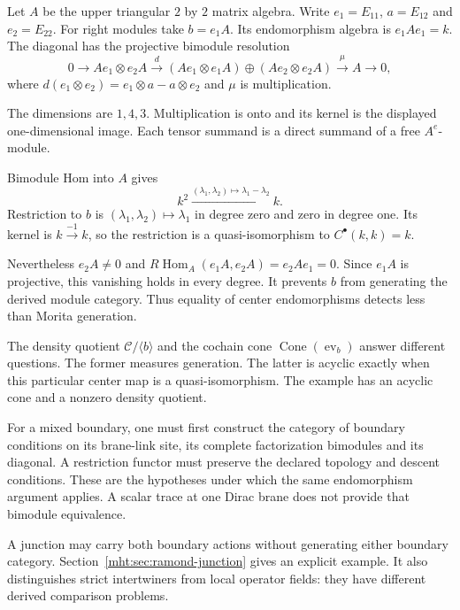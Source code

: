 \begin{example}\label{mht:ex:centre-without-density}
Let $A$ be the upper triangular $2$ by $2$ matrix algebra. Write
$e_1=E_{11}$, $a=E_{12}$ and $e_2=E_{22}$. For right modules take
$b=e_1A$. Its endomorphism algebra is $e_1Ae_1=k$. The diagonal
has the projective bimodule resolution
\[
 0\longrightarrow Ae_1\otimes e_2A
 \xrightarrow{d}
 (Ae_1\otimes e_1A)\oplus(Ae_2\otimes e_2A)
 \xrightarrow{\mu}A\longrightarrow0,
\]
where
$d(e_1\otimes e_2)=e_1\otimes a-a\otimes e_2$ and $\mu$ is
multiplication. 

The dimensions are $1,4,3$. Multiplication is
onto and its kernel is the displayed one-dimensional image.
Each tensor summand is a direct summand of a free $A^e$-module.

Bimodule Hom into $A$ gives
\[
 k^2\xrightarrow{(\lambda_1,\lambda_2)\mapsto\lambda_1-\lambda_2}k.
\]
Restriction to $b$ is $(\lambda_1,\lambda_2)\mapsto\lambda_1$ in
degree zero and zero in degree one. Its kernel is
$k\xrightarrow{-1}k$, so the restriction is a quasi-isomorphism
to $C^\bullet(k,k)=k$.

Nevertheless $e_2A\ne0$ and
$R\operatorname{Hom}_A(e_1A,e_2A)=e_2Ae_1=0$.
Since $e_1A$ is projective, this vanishing holds in every degree.
It prevents $b$ from generating the derived module category.
Thus equality of center endomorphisms detects less than Morita
generation.
\end{example}

The density quotient $\mathcal C/\langle b\rangle$ and the
cochain cone $\operatorname{Cone}(\operatorname{ev}_b)$ answer
different questions. The former measures generation. The latter
is acyclic exactly when this particular center map is a
quasi-isomorphism. The example has an acyclic cone and a nonzero
density quotient.

For a mixed boundary, one must first construct the category of
boundary conditions on its brane-link site, its complete
factorization bimodules and its diagonal. A restriction functor
must preserve the declared topology and descent conditions.
These are the hypotheses under which the same endomorphism
argument applies. A scalar trace at one Dirac brane does not
provide that bimodule equivalence.

A junction may carry both boundary actions without generating
either boundary category. Section~\ref{mht:sec:ramond-junction}
gives an explicit example. It also distinguishes strict
intertwiners from local operator fields: they have different
derived comparison problems.

